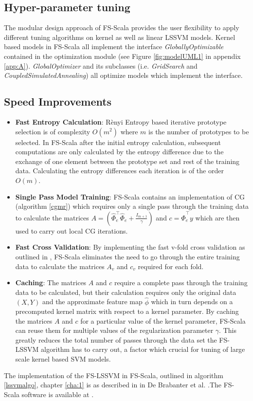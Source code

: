 \subsection*{Hyper-parameter tuning}
The modular design approach of FS-Scala provides the user flexibility to apply different tuning algorithms on kernel as well as linear LSSVM models. Kernel based models in FS-Scala all implement the interface \textit{GloballyOptimizable} contained in the optimization module (see Figure \ref{fig:modelUML1} in appendix \ref{app:A}). \textit{GlobalOptimizer} and its subclasses (i.e. \textit{GridSearch} and \textit{CoupledSimulatedAnnealing}) all optimize models which implement the  interface.

\subsection*{Speed Improvements}
\begin{itemize}
\item \textbf{Fast Entropy Calculation}:
R\`enyi Entropy based iterative prototype selection is of complexity $O(m^2)$ where $m$ is the number of prototypes to be selected. In FS-Scala after the initial entropy calculation, subsequent computations are only calculated by the entropy difference due to the exchange of one element between the prototype set and rest of the training data. Calculating the entropy differences each iteration is of the order $O(m)$.

\item \textbf{Single Pass Model Training}: 
FS-Scala contains an implementation of CG (algorithm  \ref{cgmr}) which requires only a single pass through the training data to calculate the matrices $A = \left (\hat{\Phi}^{\intercal}_e \hat{\Phi}_e + \frac{\mathit{I}_{m+1}}{\gamma} \right )$ and $c = \hat{\Phi}^{\intercal}_e y$ which are then used to carry out local CG iterations.

\item \textbf{Fast Cross Validation}:
By implementing the fast v-fold cross validation as outlined in \cite{DeBrabanter2010}, FS-Scala eliminates the need to go through the entire training data to calculate the matrices $A_v$ and $c_v$ required for each fold.

\item \textbf{Caching}:
The matrices $A$ and $c$ require a complete pass through the training data to be calculated, but their calculation requires only the original data $(X, Y)$ and the approximate feature map $\hat{\phi}$ which in turn depends on a precomputed kernel matrix with respect to a kernel parameter. By caching the matrices $A$ and $c$ for a particular value of the kernel parameter, FS-Scala can reuse them for multiple values of the regularization parameter $\gamma$. This greatly reduces the total number of passes through the data set the FS-LSSVM algorithm has to carry out, a factor which crucial for tuning of large scale kernel based SVM models.

\end{itemize}

The implementation of the FS-LSSVM in FS-Scala, outlined in algorithm \ref{lssvmalgo}, chapter \ref{cha:1} is as described in in De Brabanter et al. \cite{DeBrabanter2010}.The FS-Scala software is available at \cite{fsscala}.